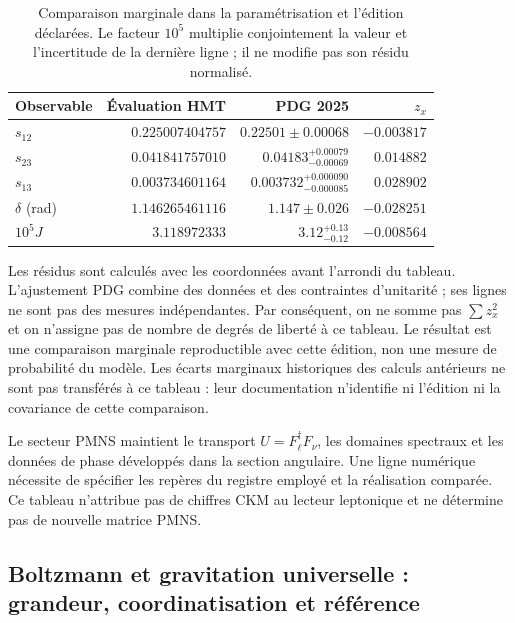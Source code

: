 \begin{table}[htbp]
\centering\small
\setlength{\tabcolsep}{4pt}
\begin{tabular}{@{}lrrr@{}}
\toprule
Observable & Évaluation HMT & PDG 2025 & \(z_x\)\\
\midrule
\(s_{12}\) & \(0.225007404757\) & \(0.22501\pm0.00068\) & \(-0.003817\)\\
\(s_{23}\) & \(0.041841757010\) & \(0.04183^{+0.00079}_{-0.00069}\) & \(0.014882\)\\
\(s_{13}\) & \(0.003734601164\) & \(0.003732^{+0.000090}_{-0.000085}\) & \(0.028902\)\\
\(\delta\) (rad) & \(1.146265461116\) & \(1.147\pm0.026\) & \(-0.028251\)\\
\(10^5J\) & \(3.118972333\) & \(3.12^{+0.13}_{-0.12}\) & \(-0.008564\)\\
\bottomrule
\end{tabular}
\caption{Comparaison marginale dans la paramétrisation et l’édition déclarées.
Le facteur \(10^5\) multiplie conjointement la valeur et l’incertitude de la
dernière ligne ; il ne modifie pas son résidu normalisé.}
\label{tab:ii-ckm-comparacion}
\end{table}

Les résidus sont calculés avec les coordonnées avant l’arrondi
du tableau. L’ajustement PDG combine des données et des contraintes d’unitarité ;
ses lignes ne sont pas des mesures indépendantes. Par conséquent, on ne somme pas
\(\sum z_x^2\) et on n’assigne pas de nombre de degrés de liberté à ce tableau.
Le résultat est une comparaison marginale reproductible avec cette édition,
non une mesure de probabilité du modèle. Les écarts marginaux
historiques des calculs antérieurs ne sont pas transférés à ce tableau :
leur documentation n’identifie ni l’édition ni la covariance de cette comparaison.

Le secteur PMNS maintient le transport \(U=F_\ell^\dagger F_\nu\), les
domaines spectraux et les données de phase développés dans la section
angulaire. Une ligne numérique nécessite de spécifier les repères du registre
employé et la réalisation comparée. Ce tableau n’attribue pas de chiffres CKM
au lecteur leptonique et ne détermine pas de nouvelle matrice PMNS.

\subsection{Boltzmann et gravitation universelle : grandeur, coordinatisation et référence}

